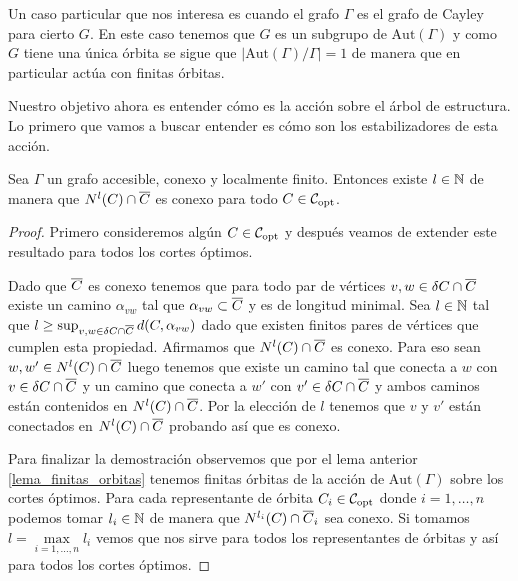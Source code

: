 \documentclass[tesis.tex]{subfiles}
\newcommand{\aut}{\text{Aut}}
\begin{document}
\begin{obs}
	Un caso particular que nos interesa es cuando el grafo $\Gamma$ es el grafo de Cayley para cierto \fg $G$.
	En este caso tenemos que $G$ es un subgrupo de $\aut(\Gamma)$ y como $G$ tiene una única órbita se sigue que $|\aut(\Gamma)/\Gamma| = 1$ de manera que en particular actúa con finitas órbitas.		
\end{obs}

Nuestro objetivo ahora es entender cómo es la acción sobre el árbol de estructura. 
Lo primero que vamos a buscar entender es cómo son los estabilizadores de esta acción.

\begin{lema}\label{lema_nlC_cap_olC_conexo}
	Sea $\Gamma$ un grafo accesible, conexo y localmente finito.
	Entonces existe $l \in \mathbb{N}$ de manera que $N^l(C) \cap \overline C$ es conexo para todo $C \in {\cal C}_{\text{opt}}$.
\end{lema}
\begin{proof}
	Primero consideremos algún $C \in {\cal C}_{\text{opt}}$ y después veamos de extender este resultado para todos los cortes óptimos.
	
	Dado que $\overline C$ es conexo tenemos que para todo par de vértices $v,w \in \delta C \cap \overline C$ existe un camino $\alpha_{vw}$ tal que $\alpha_{vw} \subset \overline C$ y es de longitud minimal.
	Sea $l \in \mathbb{N}$ tal que $l \ge \sup_{v,w \in \delta C \cap \overline C} d(C,\alpha_{vw})$ dado que existen finitos pares de vértices que cumplen esta propiedad.
	Afirmamos que $N^{l}(C) \cap \overline C$ es conexo.
	Para eso sean $w,w' \in N^{l}(C) \cap \overline C$ luego tenemos que existe un camino tal que conecta a $w$ con $v  \in \delta C \cap \overline C$ y un camino que conecta a $w'$ con $v' \in \delta C \cap \overline C$ y ambos caminos están contenidos en $N^{l}(C) \cap \overline C$.
	Por la elección de $l$ tenemos que $v$ y $v'$ están conectados en $N^l(C) \cap \overline C$ probando así que es conexo.
	
	
%	
%	
%	
%	
	
	Para finalizar la demostración observemos que por el lema anterior \ref{lema_finitas_orbitas} tenemos finitas órbitas de la acción de $\aut(\Gamma)$ sobre los cortes óptimos.
	Para cada representante de órbita $C_i \in {\cal C}_{\text{opt}}$ donde $i=1,\dots,n$ podemos tomar $l_i \in \mathbb{N}$ de manera que $ N^{l_{i}}(C_{\textit{}}) \cap \overline C_{i} $ sea conexo. 
	Si tomamos $l = \underset{{i=1,\dots,n}}{\max} l_i$ vemos que nos sirve para todos los representantes de órbitas y así para todos los cortes óptimos.
	
\end{proof}
\end{document}
